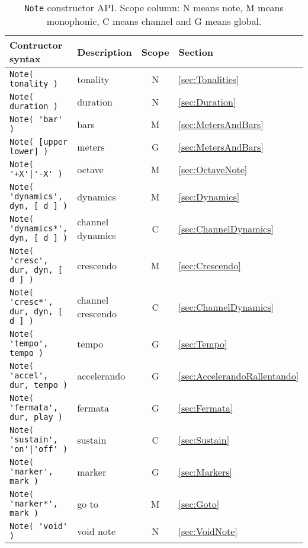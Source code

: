\documentclass{article}
\begin{document}
\begin{table}[p]
	\centering
	\begin{tabular}{llcl}
		Contructor syntax & Description & Scope & Section \\
		\hline
		\lstinline!Note( tonality )! & tonality & N & \ref{sec:Tonalities} \\
		\lstinline!Note( duration )! & duration & N & \ref{sec:Duration} \\
		\lstinline!Note( 'bar' )! & bars & M & \ref{sec:MetersAndBars} \\
		\lstinline!Note( [upper lower] )! & meters & G & \ref{sec:MetersAndBars} \\
		\lstinline!Note( '+X'|'-X' )! & octave & M & \ref{sec:OctaveNote} \\
		\lstinline!Note( 'dynamics', dyn, [ d ] )! & dynamics & M & \ref{sec:Dynamics} \\
		\lstinline!Note( 'dynamics*', dyn, [ d ] )! & channel dynamics & C & \ref{sec:ChannelDynamics} \\
		\lstinline!Note( 'cresc', dur, dyn, [ d ] )! & crescendo & M & \ref{sec:Crescendo} \\
		\lstinline!Note( 'cresc*', dur, dyn, [ d ] )! & channel crescendo & C & \ref{sec:ChannelDynamics} \\
		\lstinline!Note( 'tempo', tempo )! & tempo & G & \ref{sec:Tempo} \\
		\lstinline!Note( 'accel', dur, tempo )! & accelerando & G & \ref{sec:AccelerandoRallentando} \\
		\lstinline!Note( 'fermata', dur, play )! & fermata & G & \ref{sec:Fermata} \\
		\lstinline!Note( 'sustain', 'on'|'off' )! & sustain & C & \ref{sec:Sustain} \\
		\lstinline!Note( 'marker', mark )! & marker & G & \ref{sec:Markers} \\
		\lstinline!Note( 'marker*', mark )! & go to & M & \ref{sec:Goto} \\
		\lstinline!Note( 'void' )! & void note & N & \ref{sec:VoidNote} \\
	\end{tabular}
	\caption[\lstinline!Note! constructor API]{\lstinline!Note! constructor API. Scope column: N means note, M means monophonic, C means channel and G means global.}
	\label{tab:NoteAPI}
\end{table}
\end{document}
